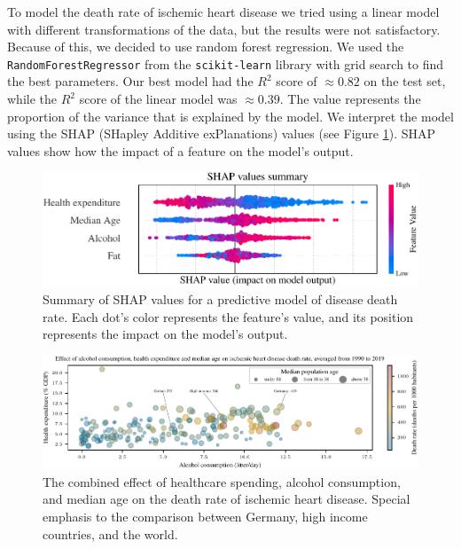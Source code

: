 
To model the death rate of ischemic heart disease we tried using a linear model with different transformations of the data, but the results were not satisfactory.
Because of this, we decided to use random forest regression. 
We used the \texttt{RandomForestRegressor} from the \texttt{scikit-learn} library \citep{scikit-learn} with grid search to find the best parameters. Our best model had the 
$R^2$ score of $\approx0.82$ on the test set, while the $R^2$ score of the linear model was $\approx0.39$. The value represents the proportion of the variance that 
is explained by the model. We interpret the model using the SHAP (SHapley Additive exPlanations) values \citep{NIPS2017_7062} (see Figure \ref{shap_values}). SHAP values 
show how the impact of a feature on the model's output. 

\begin{figure}[ht]
    \vskip 0.2in
    \begin{center}
    \centerline{\includegraphics[width=\columnwidth]{fig/fig_shap_values_summary.pdf}}
    \caption{Summary of SHAP values for a predictive model of disease death rate. 
    Each dot's color represents the feature's value, and its position represents the impact on the model's output.}
    \label{shap_values}
    \end{center}
    \vskip -0.2in
\end{figure}


\begin{figure}[ht]
    \vskip 0.2in
    \centering
    \centerline{\includegraphics[]{fig/fig_bubble_plot_factors.pdf}}
    \caption{The combined effect of healthcare spending, alcohol consumption, and median age on the death rate of ischemic heart disease. Special 
        emphasis to the comparison between Germany, high income countries, and the world.}
    \label{bubble_plot_factors}
\end{figure}

